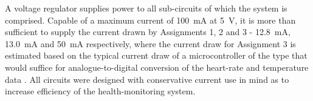 A voltage regulator supplies power to all sub-circuits of which the system is comprised. Capable of a maximum current of \SI{100}{mA} at \SI{5}{V}, it is more than sufficient to supply the current drawn by Assignments 1, 2 and 3 - \SI{12.8}{mA}, \SI{13.0}{mA} and \SI{50}{mA} respectively, where the current draw for Assignment 3 is estimated based on the typical current draw of a microcontroller of the type that would suffice for analogue-to-digital conversion of the heart-rate and temperature data \cite{arduino}. All circuits were designed with conservative current use in mind as to increase efficiency of the health-monitoring system.

\vfill









